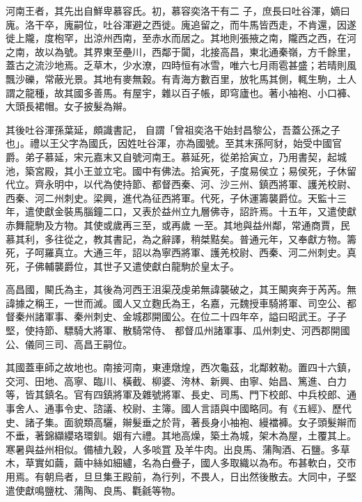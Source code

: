 \begin{pinyinscope}
 河南王者，其先出自鮮卑慕容氏。初，慕容奕洛干有二
 子，庶長曰吐谷渾，嫡曰廆。洛干卒，廆嗣位，吐谷渾避之西徙。廆追留之，而牛馬皆西走，不肯還，因遂徙上隴，度枹罕，出涼州西南，至赤水而居之。其地則張掖之南，隴西之西，在河之南，故以為號。其界東至壘川，西鄰于闐，北接高昌，東北通秦嶺，方千餘里，蓋古之流沙地焉。乏草木，少水潦，四時恒有冰雪，唯六七月雨雹甚盛；若晴則風飄沙礫，常蔽光景。其地有麥無穀。有青海方數百里，放牝馬其側，輒生駒，土人謂之龍種，故其國多善馬。有屋宇，雜以百子帳，即穹廬也。著小袖袍、小口褲、大頭長裙帽。女子披髮為辮。



 其後吐谷渾孫葉延，頗識書記，
 自謂「曾祖奕洛干始封昌黎公，吾蓋公孫之子也」。禮以王父字為國氏，因姓吐谷渾，亦為國號。至其末孫阿豺，始受中國官爵。弟子慕延，宋元嘉末又自號河南王。慕延死，從弟拾寅立，乃用書契，起城池，築宮殿，其小王並立宅。國中有佛法。拾寅死，子度易侯立；易侯死，子休留代立。齊永明中，以代為使持節、都督西秦、河、沙三州、鎮西將軍、護羌校尉、西秦、河二州刺史。梁興，進代為征西將軍。代死，子休運籌襲爵位。天監十三年，遣使獻金裝馬腦鐘二口，又表於益州立九層佛寺，詔許焉。十五年，又遣使獻赤舞龍駒及方物。其使或歲再三至，或再歲
 一至。其地與益州鄰，常通商賈，民慕其利，多往從之，教其書記，為之辭譯，稍桀黠矣。普通元年，又奉獻方物。籌死，子呵羅真立。大通三年，詔以為寧西將軍、護羌校尉、西秦、河二州刺史。真死，子佛輔襲爵位，其世子又遣使獻白龍駒於皇太子。



 高昌國，闞氏為主，其後為河西王沮渠茂虔弟無諱襲破之，其王闞爽奔于芮芮。無諱據之稱王，一世而滅。國人又立麴氏為王，名嘉，元魏授車騎將軍、司空公、都督秦州諸軍事、秦州刺史、金城郡開國公。在位二十四年卒，謚曰昭武王。子子堅，使持節、驃騎大將軍、散騎常侍、
 都督瓜州諸軍事、瓜州刺史、河西郡開國公、儀同三司、高昌王嗣位。



 其國蓋車師之故地也。南接河南，東連燉煌，西次龜茲，北鄰敕勒。置四十六鎮，交河、田地、高寧、臨川、橫截、柳婆、洿林、新興、由寧、始昌、篤進、白力等，皆其鎮名。官有四鎮將軍及雜號將軍、長史、司馬、門下校郎、中兵校郎、通事舍人、通事令史、諮議、校尉、主簿。國人言語與中國略同。有《五經》、歷代史、諸子集。面貌類高驪，辮髮垂之於背，著長身小袖袍、縵襠褲。女子頭髮辮而不垂，著錦纈纓珞環釧。姻有六禮。其地高燥，築土為城，架木為屋，土覆其上。寒暑與益州相似。備植九穀，人多啖罝
 及羊牛肉。出良馬、蒲陶酒、石鹽。多草木，草實如繭，繭中絲如細纑，名為白疊子，國人多取織以為布。布甚軟白，交市用焉。有朝烏者，旦旦集王殿前，為行列，不畏人，日出然後散去。大同中，子堅遣使獻鳴鹽枕、蒲陶、良馬、氍毹等物。




\end{pinyinscope}
